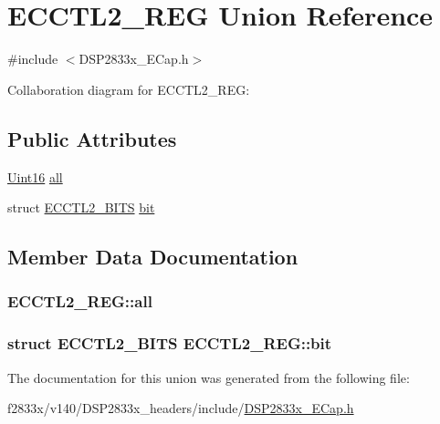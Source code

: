 \hypertarget{union_e_c_c_t_l2___r_e_g}{}\section{E\+C\+C\+T\+L2\+\_\+\+R\+E\+G Union Reference}
\label{union_e_c_c_t_l2___r_e_g}


{\ttfamily \#include $<$D\+S\+P2833x\+\_\+\+E\+Cap.\+h$>$}



Collaboration diagram for E\+C\+C\+T\+L2\+\_\+\+R\+E\+G\+:
\subsection*{Public Attributes}
\begin{DoxyCompactItemize}
\item 
\hyperlink{_d_s_p2833x___device_8h_a59a9f6be4562c327cbfb4f7e8e18f08b}{Uint16} \hyperlink{union_e_c_c_t_l2___r_e_g_a8b4bd86d229b37c2fe48d7f073484f6e}{all}
\item 
struct \hyperlink{struct_e_c_c_t_l2___b_i_t_s}{E\+C\+C\+T\+L2\+\_\+\+B\+I\+T\+S} \hyperlink{union_e_c_c_t_l2___r_e_g_a128462e351fa97a90d6488945404d538}{bit}
\end{DoxyCompactItemize}


\subsection{Member Data Documentation}
\hypertarget{union_e_c_c_t_l2___r_e_g_a8b4bd86d229b37c2fe48d7f073484f6e}{}
\subsubsection[{all}]{ E\+C\+C\+T\+L2\+\_\+\+R\+E\+G\+::all}\label{union_e_c_c_t_l2___r_e_g_a8b4bd86d229b37c2fe48d7f073484f6e}
\hypertarget{union_e_c_c_t_l2___r_e_g_a128462e351fa97a90d6488945404d538}{}
\subsubsection[{bit}]{\setlength{\rightskip}{0pt plus 5cm}struct {\bf E\+C\+C\+T\+L2\+\_\+\+B\+I\+T\+S} E\+C\+C\+T\+L2\+\_\+\+R\+E\+G\+::bit}\label{union_e_c_c_t_l2___r_e_g_a128462e351fa97a90d6488945404d538}


The documentation for this union was generated from the following file\+:\begin{DoxyCompactItemize}
\item 
f2833x/v140/\+D\+S\+P2833x\+\_\+headers/include/\hyperlink{_d_s_p2833x___e_cap_8h}{D\+S\+P2833x\+\_\+\+E\+Cap.\+h}\end{DoxyCompactItemize}
